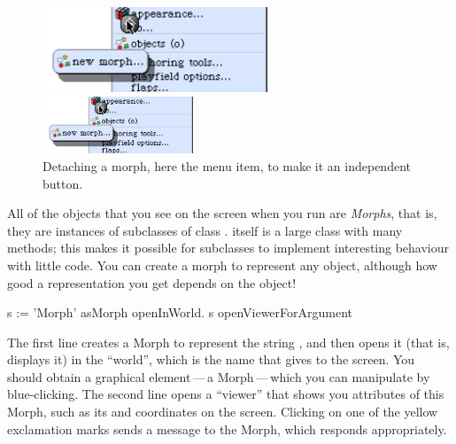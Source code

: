 \documentclass[a4paper,10pt,twoside]{book}
\begin{document}

\begin{figure}[ht]
	\ifluluelse
		{\centerline{\includegraphics[width=0.6\textwidth]{detachingMenu}}}
		{\centerline{\includegraphics[width=0.4\textwidth]{detachingMenu}}}
	\caption{Detaching a morph, here the  menu item, to make it an independent button.
		\label{fig:detachingMenu}}
\end{figure}

All of the objects that you see on the screen when you run \sq are \emph{Morphs}, that is, they are instances of subclasses of class .
\mbox{} itself is a large class with many methods; this makes it possible for subclasses to implement interesting behaviour with little code.
You can create a morph to represent any object, although how good a representation you get depends on the object!

\begin{code}{}
s := 'Morph' asMorph openInWorld.
s openViewerForArgument
\end{code}

The first line creates a Morph to represent the string , and then opens it (that is, displays it) in the ``world'', which is the name that \sq gives to the screen.  
You should obtain a graphical element\,---\,a Morph\,---\,which you can manipulate by blue-clicking.
The second line opens a ``viewer'' that shows you attributes of this Morph, such as its  and   coordinates on the screen.  Clicking on one of the yellow exclamation marks sends a message to the Morph, which responds appropriately.
\end{document}
